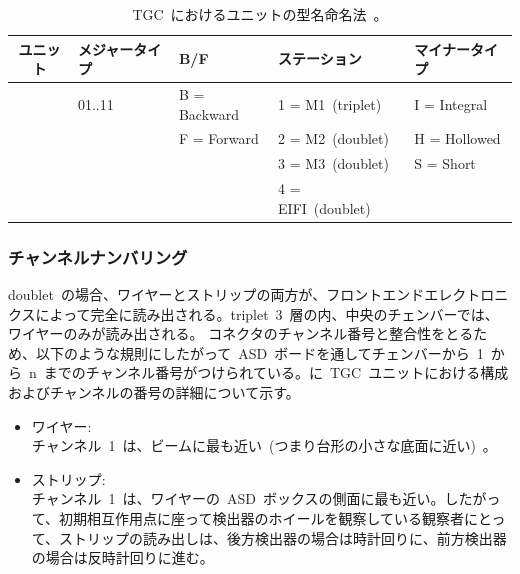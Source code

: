 \begin{table}[tb]
	\centering
	\begin{tabular}{c|llll}\hline
		 ユニット & メジャータイプ & B/F & ステーション & マイナータイプ \\ \hline
		 &01..11& B = Backward & 1 = M1~(triplet)~& I = Integral \\
		 && F = Forward  & 2 = M2~(doublet)~& H = Hollowed \\
		 &&              & 3 = M3~(doublet)~& S = Short    \\
		 &&              & 4 = EIFI~(doublet)~& \\ \hline
	\end{tabular}
	\caption[TGC~におけるユニットの型名命名法]{TGC~におけるユニットの型名命名法~\cite{TR:02}。}
	\label{tb:unit1}
\end{table}

\subsubsection{チャンネルナンバリング}
doublet~の場合、ワイヤーとストリップの両方が、フロントエンドエレクトロニクスによって完全に読み出される。triplet~3~層の内、中央のチェンバーでは、ワイヤーのみが読み出される。
コネクタのチャンネル番号と整合性をとるため、以下のような規則にしたがって~ASD~ボードを通してチェンバーから~1~から~n~までのチャンネル番号がつけられている。に~TGC~ユニットにおける構成およびチャンネルの番号の詳細について示す。
\begin{itemize}
\item ワイヤー: \\
チャンネル~1~は、ビームに最も近い~(つまり台形の小さな底面に近い)~。
\item ストリップ: \\
チャンネル~1~は、ワイヤーの~ASD~ボックスの側面に最も近い。したがって、初期相互作用点に座って検出器のホイールを観察している観察者にとって、ストリップの読み出しは、後方検出器の場合は時計回りに、前方検出器の場合は反時計回りに進む。
\end{itemize}

